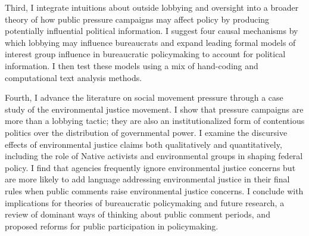   Third, I integrate intuitions about outside lobbying and oversight into a broader theory of how public pressure campaigns may affect policy by producing potentially influential political information. I suggest four causal mechanisms by which lobbying may influence bureaucrats and expand leading formal models of interest group influence in bureaucratic policymaking to account for political information. I then test these models using a mix of hand-coding and computational text analysis methods.   
  
  Fourth, I advance the literature on social movement pressure through a case study of the environmental justice movement. I show that pressure campaigns are more than a lobbying tactic; they are also an institutionalized form of contentious politics over the distribution of governmental power. I examine the discursive effects of environmental justice claims both qualitatively and quantitatively, including the role of Native activists and environmental groups in shaping federal policy. I find that agencies frequently ignore environmental justice concerns but are more likely to add language addressing environmental justice in their final rules when public comments raise environmental justice concerns. I conclude with implications for theories of bureaucratic policymaking and future research, a review of dominant ways of thinking about public comment periods, and proposed reforms for public participation in policymaking.